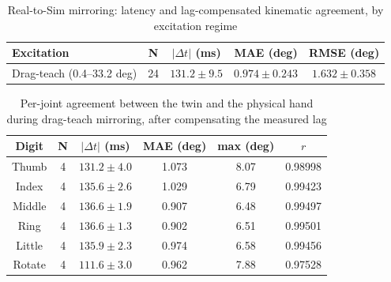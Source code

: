 
\begin{table}[t]
\caption{Real-to-Sim mirroring: latency and lag-compensated kinematic agreement, by excitation regime}
\begin{center}
\renewcommand{\arraystretch}{1.12}
\begin{tabular}{|p{1.75cm}|c|c|c|c|}
\hline
\textbf{Excitation} & \textbf{N} & \textbf{$|\Delta t|$ (ms)} & \textbf{MAE (deg)} & \textbf{RMSE (deg)} \\
\hline
Drag-teach (0.4--33.2 deg) & 24 & $131.2 \pm 9.5$ & $0.974 \pm 0.243$ & $1.632 \pm 0.358$ \\
\hline
\end{tabular}
\label{tab:latency}
\end{center}
\end{table}

\begin{table}[t]
\caption{Per-joint agreement between the twin and the physical hand during drag-teach mirroring, after compensating the measured lag}
\begin{center}
\renewcommand{\arraystretch}{1.12}
\begin{tabular}{|c|c|c|c|c|c|}
\hline
\textbf{Digit} & \textbf{N} & \textbf{$|\Delta t|$ (ms)} & \textbf{MAE (deg)} & \textbf{max (deg)} & \textbf{$r$} \\
\hline
Thumb & 4 & $131.2 \pm 4.0$ & 1.073 & 8.07 & 0.98998 \\
\hline
Index & 4 & $135.6 \pm 2.6$ & 1.029 & 6.79 & 0.99423 \\
\hline
Middle & 4 & $136.6 \pm 1.9$ & 0.907 & 6.48 & 0.99497 \\
\hline
Ring & 4 & $136.6 \pm 1.3$ & 0.902 & 6.51 & 0.99501 \\
\hline
Little & 4 & $135.9 \pm 2.3$ & 0.974 & 6.58 & 0.99456 \\
\hline
Rotate & 4 & $111.6 \pm 3.0$ & 0.962 & 7.88 & 0.97528 \\
\hline
\end{tabular}
\label{tab:perjoint}
\end{center}
\end{table}
